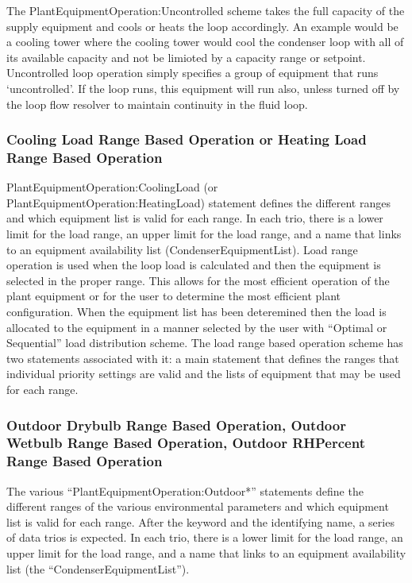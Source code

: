 The PlantEquipmentOperation:Uncontrolled scheme takes the full capacity of the supply equipment and cools or heats the loop accordingly. An example would be a cooling tower where the cooling tower would cool the condenser loop with all of its available capacity and not be limioted by a capacity range or setpoint. Uncontrolled loop operation simply specifies a group of equipment that runs `uncontrolled'. If the loop runs, this equipment will run also, unless turned off by the loop flow resolver to maintain continuity in the fluid loop.

\subsubsection{Cooling Load Range Based Operation or Heating Load Range Based Operation}\label{cooling-load-range-based-operation-or-heating-load-range-based-operation-1}

PlantEquipmentOperation:CoolingLoad (or PlantEquipmentOperation:HeatingLoad) statement defines the different ranges and which equipment list is valid for each range. In each trio, there is a lower limit for the load range, an upper limit for the load range, and a name that links to an equipment availability list (CondenserEquipmentList). Load range operation is used when the loop load is calculated and then the equipment is selected in the proper range. This allows for the most efficient operation of the plant equipment or for the user to determine the most efficient plant configuration. When the equipment list has been deteremined then the load is allocated to the equipment in a manner selected by the user with ``Optimal or Sequential'' load distribution scheme. The load range based operation scheme has two statements associated with it: a main statement that defines the ranges that individual priority settings are valid and the lists of equipment that may be used for each range.

\subsubsection{Outdoor Drybulb Range Based Operation, Outdoor Wetbulb Range Based Operation, Outdoor RHPercent Range Based Operation}\label{outdoor-drybulb-range-based-operation-outdoor-wetbulb-range-based-operation-outdoor-rhpercent-range-based-operation-1}

The various ``PlantEquipmentOperation:Outdoor*'' statements define the different ranges of the various environmental parameters and which equipment list is valid for each range. After the keyword and the identifying name, a series of data trios is expected. In each trio, there is a lower limit for the load range, an upper limit for the load range, and a name that links to an equipment availability list (the ``CondenserEquipmentList'').

